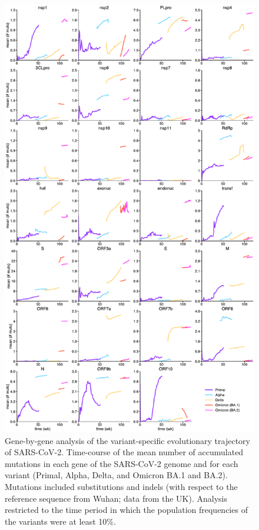 \begin{figure}[ht!]
    \centering
    \includegraphics[width=0.7375\linewidth]{assets/Ch4Fig4.pdf}
    \caption{Gene-by-gene analysis of the variant-specific evolutionary trajectory of SARS-CoV-2. Time-course of the mean number of accumulated mutations in each gene of the SARS-CoV-2 genome and for each variant (Primal, Alpha, Delta, and Omicron BA.1 and BA.2). Mutations included substitutions and indels (with respect to the reference sequence from Wuhan; data from the UK). Analysis restricted to the time period in which the population frequencies of the variants were at least 10\%.}\label{fig:fig4.4}
\end{figure}

